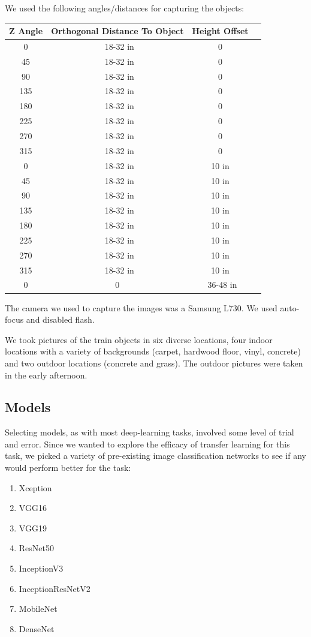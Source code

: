 \documentclass{article}
\begin{document}
We used the following angles/distances for capturing the objects:

\begin{tabular}{c c c c}
	Z Angle & Orthogonal Distance To Object & Height Offset \\
	\hline
	0 & ~18-32 in & 0 \\
	45 & ~18-32 in & 0 \\
	90 & ~18-32 in & 0 \\
	135 & ~18-32 in & 0 \\
	180 & ~18-32 in & 0 \\
	225 & ~18-32 in & 0 \\
	270 & ~18-32 in & 0 \\
	315 & ~18-32 in & 0 \\
	0 & ~18-32 in & 10 in \\
	45 & ~18-32 in & 10 in \\
	90 & ~18-32 in & 10 in \\
	135 & ~18-32 in & 10 in \\
	180 & ~18-32 in & 10 in \\
	225 & ~18-32 in & 10 in \\
	270 & ~18-32 in & 10 in \\
	315 & ~18-32 in & 10 in \\
	0 & 0 & ~36-48 in \\
\end{tabular}

The camera we used to capture the images was a Samsung L730. We used auto-focus and disabled flash.

We took pictures of the train objects in six diverse locations, four indoor locations with a variety of backgrounds (carpet, hardwood floor, vinyl, concrete) and two outdoor locations (concrete and grass). The outdoor pictures were taken in the early afternoon.

\subsection{Models}

Selecting models, as with most deep-learning tasks, involved some level of trial and error. Since we wanted to explore the efficacy of transfer learning for this task, we picked a variety of pre-existing image classification networks to see if any would perform better for the task:

\begin{enumerate}
	\item Xception \cite{chollet16}
	\item VGG16 \cite{simonyan14}
	\item VGG19 \cite{simonyan14}
	\item ResNet50 \cite{he15}
	\item InceptionV3 \cite{szegedy15}
	\item InceptionResNetV2 \cite{szegedy16}
	\item MobileNet \cite{howard}
	\item DenseNet \cite{huang16}
\end{enumerate}
\end{document}
